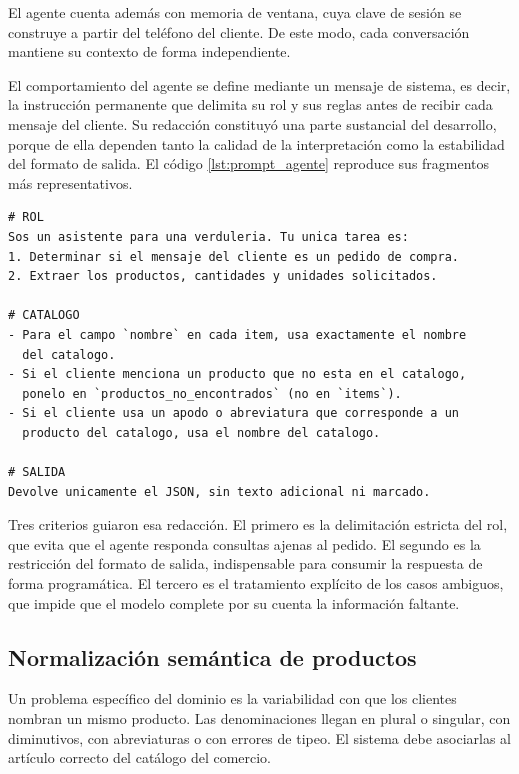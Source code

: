 El agente cuenta además con memoria de ventana, cuya clave de sesión se construye a partir del teléfono del cliente. De este modo, cada conversación mantiene su contexto de forma independiente.

El comportamiento del agente se define mediante un mensaje de sistema, es decir, la instrucción permanente que delimita su rol y sus reglas antes de recibir cada mensaje del cliente. Su redacción constituyó una parte sustancial del desarrollo, porque de ella dependen tanto la calidad de la interpretación como la estabilidad del formato de salida. El código \ref{lst:prompt_agente} reproduce sus fragmentos más representativos.

\begin{lstlisting}[caption={Fragmentos del mensaje de sistema del agente de interpretación.}, label={lst:prompt_agente}]
# ROL
Sos un asistente para una verduleria. Tu unica tarea es:
1. Determinar si el mensaje del cliente es un pedido de compra.
2. Extraer los productos, cantidades y unidades solicitados.

# CATALOGO
- Para el campo `nombre` en cada item, usa exactamente el nombre
  del catalogo.
- Si el cliente menciona un producto que no esta en el catalogo,
  ponelo en `productos_no_encontrados` (no en `items`).
- Si el cliente usa un apodo o abreviatura que corresponde a un
  producto del catalogo, usa el nombre del catalogo.

# SALIDA
Devolve unicamente el JSON, sin texto adicional ni marcado.
\end{lstlisting}

Tres criterios guiaron esa redacción. El primero es la delimitación estricta del rol, que evita que el agente responda consultas ajenas al pedido. El segundo es la restricción del formato de salida, indispensable para consumir la respuesta de forma programática. El tercero es el tratamiento explícito de los casos ambiguos, que impide que el modelo complete por su cuenta la información faltante.

\subsection{Normalización semántica de productos}
\label{subsec:normalizacion}

Un problema específico del dominio es la variabilidad con que los clientes nombran un mismo producto. Las denominaciones llegan en plural o singular, con diminutivos, con abreviaturas o con errores de tipeo. El sistema debe asociarlas al artículo correcto del catálogo del comercio.

